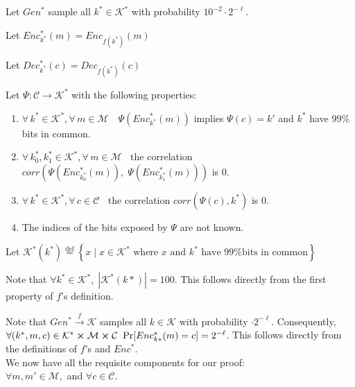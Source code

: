 \documentclass{article}
\newcommand*{\defeq}{\stackrel{\text{def}}{=}}
\begin{document}
    Let $Gen^{*}$ sample all $k^{*} \in \mathcal{K}^{*}$ with probability $10^{-2}\cdot2^{-\ell}$.
    
    Let $Enc^{*}_{k^*}(m) = Enc_{f(k^*)}(m)$
    
    Let $Dec^{*}_{k^*}(c) = Dec_{f(k^*)}(c)$
   
    Let $\Psi : \mathcal{C} \to \mathcal{K}^{*}$ with the following properties:
    
    \begin{enumerate}
    
    	\item $\forall\, k^{*} \in \mathcal{K}^{*}, \forall\, m \in \mathcal{M} \quad \Psi(Enc^{*}_{k^*}(m))$ implies $\Psi(c) = k'$ and $k^*$ have 99\% bits in common.
    	
    	\item $\forall\, k^{*}_0, k^{*}_1 \in \mathcal{K}^{*}, \forall\, m \in \mathcal{M} \;\;$ the correlation $corr(\Psi(Enc^{*}_{k^*_0}(m)),\; \Psi(Enc^{*}_{k^*_1}(m)))$ is $0$.
    	
    	\item $\forall\, k^{*} \in \mathcal{K}^{*}, \forall\, c \in \mathcal{C} \;\;$ the correlation $corr(\Psi(c),k^{*})$ is $0$.
    	
    	\item The indices of the bits exposed by $\Psi$ are not known.
   
    \end{enumerate}

	Let $\mathcal{K}^*(k^*) \defeq \left\{ x  \;|\; x \in \mathcal{K^*} \text{ where } x \text{ and } k^* \text{ have 99\% bits in common} \right\}$
    
    Note that $\forall k^* \in \mathcal{K}^*,\; |\mathcal{K}^*(k*)| = 100$. This follows directly from the first property of $f$'s definition.
    
    Note that $Gen^* \xrightarrow{f} \mathcal{K}$ samples all $k \in \mathcal{K}$ with probability $\cdot2^{-\ell}$. Consequently,\\ $\forall (k^*,m,c) \in \mathcal{K^*} \cross \mathcal{M} \cross \mathcal{C}\;\; \text{Pr}[Enc^*_{k*}(m) = c] = 2^{-\ell}$. This follows directly from the definitions of $f$'s and $Enc^*$.\\
    
    We now have all the requisite components for our proof:\\
    
    $\forall m,m' \in \mathcal{M},$ and $\forall c \in \mathcal{C}$.
    
\end{document}
